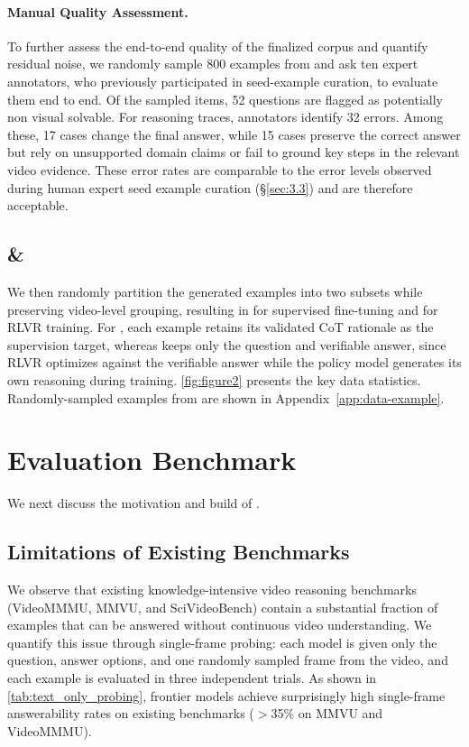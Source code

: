 \paragraph{Manual Quality Assessment.} 
To further assess the end-to-end quality of the finalized corpus and quantify residual noise, we randomly sample 800 examples from \sftdata and ask ten expert annotators, who previously participated in seed-example curation, to evaluate them end to end. Of the sampled items, 52 questions are flagged as potentially non visual solvable. For reasoning traces, annotators identify 32 errors. Among these, 17 cases change the final answer, while 15 cases preserve the correct answer but rely on unsupported domain claims or fail to ground key steps in the relevant video evidence. These error rates are comparable to the error levels observed during human expert seed example curation (\S\ref{sec:3.3}) and are therefore acceptable.

\subsection{\sftdata \& \rldata} 
We then randomly partition the generated \nexample examples into two subsets while preserving video-level grouping, resulting in \sftdata for supervised fine-tuning and \rldata for RLVR training.
For \sftdata, each example retains its validated CoT rationale as the supervision target, whereas \rldata keeps only the question and verifiable answer, since RLVR optimizes against the verifiable answer while the policy model generates its own reasoning during training.
\autoref{fig:figure2} presents the key data statistics.
Randomly-sampled examples from \ours are shown in Appendix~\ref{app:data-example}.

\section{\eval Evaluation Benchmark}\label{sec:eval-data}
We next discuss the motivation and build of \eval.

\subsection{Limitations of Existing Benchmarks}

We observe that existing knowledge-intensive video reasoning benchmarks (\eg VideoMMMU, MMVU, and SciVideoBench) contain a substantial fraction of examples that can be answered without continuous video understanding. We quantify this issue through single-frame probing: each model is given only the question, answer options, and one randomly sampled frame from the video, and each example is evaluated in three independent trials. As shown in \autoref{tab:text_only_probing}, frontier models achieve surprisingly high single-frame answerability rates on existing benchmarks (\eg $>$35\% on MMVU and VideoMMMU).

